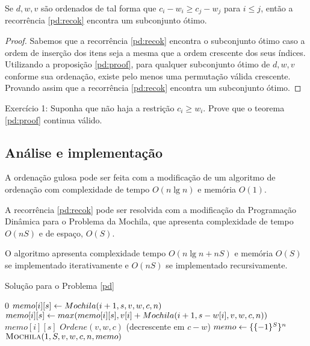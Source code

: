 \begin{lema} \label{pd:impl}
  Se $d, w, v$ são ordenados de tal forma que $c_{i} - w_{i} \geq c_{j} - w_{j}$ para $i \leq j$, então a recorrência \ref{pd:recok} encontra um subconjunto ótimo.
\end{lema}
\begin{proof}
  Sabemos que a recorrência \ref{pd:recok} encontra o subconjunto ótimo caso a ordem de inserção dos itens seja a mesma que a ordem crescente dos seus índices.
  Utilizando a proposição \ref{pd:proof}, para qualquer subconjunto ótimo de $d, w, v$ conforme sua ordenação, existe pelo menos uma permutação válida crescente.
  Provando assim que a recorrência \ref{pd:recok} encontra um subconjunto ótimo.
\end{proof}

Exercício 1: Suponha que não haja a restrição $c_i \geq w_i$. Prove que o teorema \ref{pd:proof} continua válido.

\subsection*{Análise e implementação}

A ordenação gulosa pode ser feita com a modificação de um algoritmo de ordenação com complexidade de tempo $O(n \lg n)$ e memória $O(1)$.

A recorrência \ref{pd:recok} pode ser resolvida com a modificação da Programação Dinâmica para o Problema da Mochila, que apresenta complexidade de tempo $O(nS)$ e de espaço, $O(S)$.

O algoritmo apresenta complexidade tempo $O(n \lg n + nS)$ e memória $O(S)$ se implementado iterativamente e $O(nS)$ se implementado recursivamente.

\begin{algorithm}[H]
\caption{Solução para o Problema \ref{pd}}
\label{pd:code}
\begin{algorithmic}[1]
    \State \Return $0$
  \EndIf
    \State $memo[i][s] \leftarrow Mochila(i + 1, s, v, w, c, n)$
      \State $memo[i][s] \leftarrow max(memo[i][s], v[i] + Mochila(i + 1, s - w[i], v, w, c, n))$
    \EndIf
  \EndIf
  \State \Return $memo[i][s]$
\EndFunction
{}
    \State $Ordene(v, w, c)$ (decrescente em $c - w$) 
    \State $memo \leftarrow \{\{-1\}^S\}^n$
    \State \Return $\textsc{Mochila}(1, S, v, w, c, n, memo)$
\EndFunction
\end{algorithmic}
\end{algorithm}